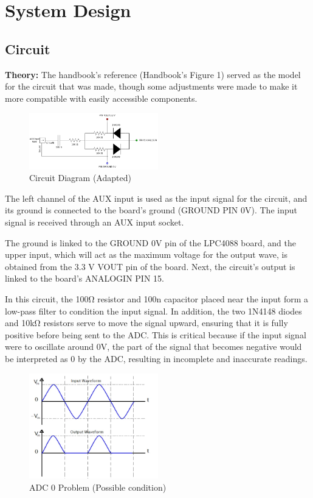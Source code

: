 \documentclass{cce2014-design}
\begin{document}
\section{System Design}
 {
  \subsection{Circuit}
  {
	  \textbf{Theory:}
	  The handbook's reference (Handbook's Figure 1) served as the
	  model for the circuit that was made, though some adjustments were
	  made to make
	  it more compatible with easily accessible components.
	  \begin{figure}[H]
		  \centering
		  \includegraphics[width=0.5\textwidth]{circuit-diagram}
		  \caption{Circuit Diagram (Adapted)}
		  \label{fig:Circuit Diagram(Adapted)}
	  \end{figure}

	  The left channel of the AUX input is used as the input signal
	  for the circuit, and its ground is connected to the board's ground
	  (GROUND PIN
	  0V). The input signal is received through an AUX input socket.

	  The ground is linked to the GROUND 0V pin of the LPC4088 board,
	  and the upper input, which will act as the maximum voltage for the
	  output wave,
	  is obtained from the 3.3 V VOUT pin of the board. Next, the circuit's
	  output is
	  linked to the board's ANALOGIN PIN 15.

	  In this circuit, the 100Ω resistor and 100n capacitor placed
	  near the input form a low-pass filter to condition the input signal.
	  In
	  addition, the two 1N4148 diodes and 10kΩ resistors serve to move the
	  signal
	  upward, ensuring that it is fully positive before being sent to the
	  ADC.	This
	  is critical because if the input signal were to oscillate around 0V,
	  the part
	  of the signal that becomes negative would be interpreted as 0 by the
	  ADC,
	  resulting in incomplete and inaccurate readings.

	  \begin{figure}[H]
		  \centering
		  \includegraphics[width=0.5\textwidth]{ADC-problem}
		  \caption{ADC 0 Problem (Possible condition)}
		  \label{fig: ADC 0 Problem (Possible condition)}
	  \end{figure}

}}
\end{document}
